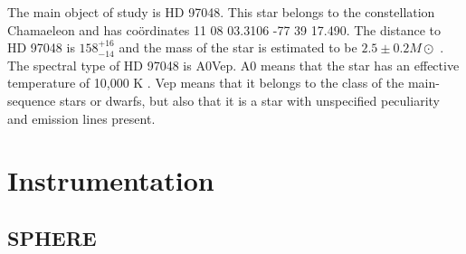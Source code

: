 \documentclass[twoside,single]{lion-msc}
\begin{document}
The main object of study is HD 97048. This star belongs to the constellation Chamaeleon and has co\"ordinates 11 08 03.3106 -77 39 17.490. The distance to HD 97048 is $158^{+16}_{-14}$  \cite{VanLeeuwen2007} and the mass of the star is estimated to be $2.5\pm 0.2 M\odot$ \cite{VanDenAncker1998}. The spectral type of HD 97048 is A0Vep. A0 means that the star has an effective temperature of 10,000 K \cite{Maaskant2013}. Vep means that it belongs to the class of the main-sequence stars or dwarfs, but also that it is a star with unspecified peculiarity and emission lines present.
\bigskip


\chapter{Instrumentation}
\section{SPHERE}
\end{document}
